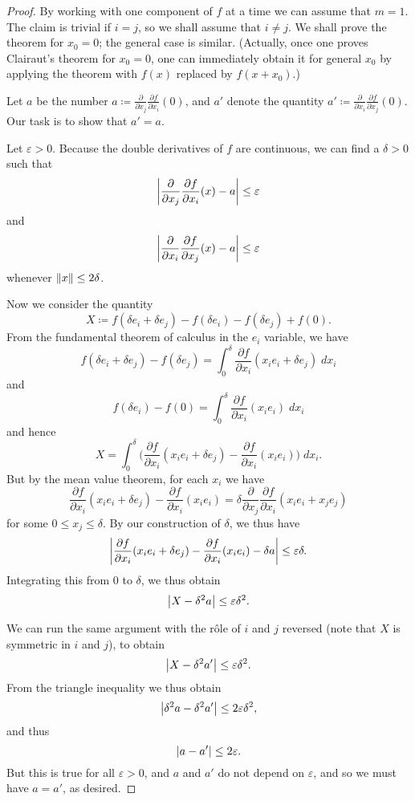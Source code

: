 \begin{proof}
    By working with one component of \(f\) at a time we can assume that \(m = 1\).
    The claim is trivial if \(i = j\), so we shall assume that \(i \neq j\).
    We shall prove the theorem for \(x_0 = 0\);
    the general case is similar.
    (Actually, once one proves Clairaut's theorem for \(x_0 = 0\), one can immediately obtain it for general \(x_0\) by applying the theorem with \(f(x)\) replaced by \(f(x + x_0)\).)

    Let \(a\) be the number \(a \coloneqq \frac{\partial}{\partial x_j} \frac{\partial f}{\partial x_i}(0)\), and \(a'\) denote the quantity \(a' \coloneqq \frac{\partial}{\partial x_i} \frac{\partial f}{\partial x_j}(0)\).
    Our task is to show that \(a' = a\).

    Let \(\varepsilon > 0\).
    Because the double derivatives of \(f\) are continuous, we can find a \(\delta > 0\) such that
    \[
        \abs*{\frac{\partial}{\partial x_j} \frac{\partial f}{\partial x_i}(x) - a} \leq \varepsilon
    \]
    and
    \[
        \abs*{\frac{\partial}{\partial x_i} \frac{\partial f}{\partial x_j}(x) - a} \leq \varepsilon
    \]
    whenever \(\norm*{x} \leq 2\delta\).

    Now we consider the quantity
    \[
        X \coloneqq f(\delta e_i + \delta e_j) - f(\delta e_i) - f(\delta e_j) + f(0).
    \]
    From the fundamental theorem of calculus in the \(e_i\) variable, we have
    \[
        f(\delta e_i + \delta e_j) - f(\delta e_j) = \int_0^{\delta} \frac{\partial f}{\partial x_i}(x_i e_i + \delta e_j) \; d x_i
    \]
    and
    \[
        f(\delta e_i) - f(0) = \int_0^{\delta} \frac{\partial f}{\partial x_i}(x_i e_i) \; d x_i
    \]
    and hence
    \[
        X = \int_0^{\delta} \bigg(\frac{\partial f}{\partial x_i} (x_i e_i + \delta e_j) - \frac{\partial f}{\partial x_i} (x_i e_i)\bigg) \; d x_i.
    \]
    But by the mean value theorem, for each \(x_i\) we have
    \[
        \frac{\partial f}{\partial x_i} (x_i e_i + \delta e_j) - \frac{\partial f}{\partial x_i} (x_i e_i) = \delta \frac{\partial}{\partial x_j} \frac{\partial f}{\partial x_i} (x_i e_i + x_j e_j)
    \]
    for some \(0 \leq x_j \leq \delta\).
    By our construction of \(\delta\), we thus have
    \[
        \abs*{\frac{\partial f}{\partial x_i} (x_i e_i + \delta e_j) - \frac{\partial f}{\partial x_i} (x_i e_i) - \delta a} \leq \varepsilon \delta.
    \]
    Integrating this from \(0\) to \(\delta\), we thus obtain
    \[
        \abs*{X - \delta^2 a} \leq \varepsilon \delta^2.
    \]

    We can run the same argument with the rôle of \(i\) and \(j\) reversed (note that \(X\) is symmetric in \(i\) and \(j\)), to obtain
    \[
        \abs*{X - \delta^2 a'} \leq \varepsilon \delta^2.
    \]
    From the triangle inequality we thus obtain
    \[
        \abs*{\delta^2 a - \delta^2 a'} \leq 2 \varepsilon \delta^2,
    \]
    and thus
    \[
        \abs*{a - a'} \leq 2 \varepsilon.
    \]
    But this is true for all \(\varepsilon > 0\), and \(a\) and \(a'\) do not depend on \(\varepsilon\), and so we must have \(a = a'\), as desired.
\end{proof}

